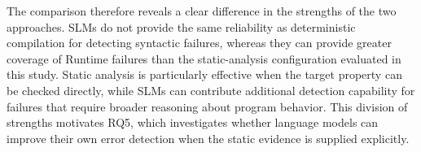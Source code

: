 The comparison therefore reveals a clear difference in the strengths of the two approaches. SLMs do not provide the same reliability as deterministic compilation for detecting syntactic failures, whereas they can provide greater coverage of Runtime failures than the static-analysis configuration evaluated in this study. Static analysis is particularly effective when the target property can be checked directly, while SLMs can contribute additional detection capability for failures that require broader reasoning about program behavior. This division of strengths motivates RQ5, which investigates whether language models can improve their own error detection when the static evidence is supplied explicitly.
